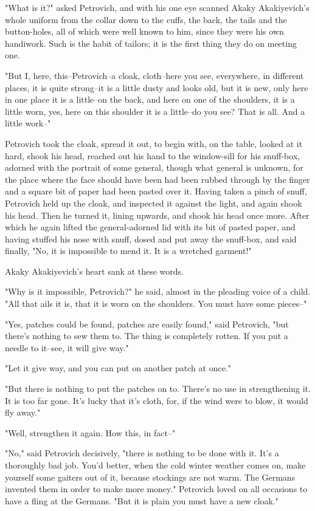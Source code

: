 "What is it?" asked Petrovich, and with his one eye scanned Akaky
Akakiyevich's whole uniform from the collar down to the cuffs, the
back, the tails and the button-holes, all of which were well known to
him, since they were his own handiwork. Such is the habit of tailors;
it is the first thing they do on meeting one.

"But I, here, this--Petrovich--a cloak, cloth--here you see,
everywhere, in different places, it is quite strong--it is a little
dusty and looks old, but it is new, only here in one place it is a
little--on the back, and here on one of the shoulders, it is a little
worn, yes, here on this shoulder it is a little--do you see? That is
all. And a little work--"

Petrovich took the cloak, spread it out, to begin with, on the table,
looked at it hard, shook his head, reached out his hand to the
window-sill for his snuff-box, adorned with the portrait of some
general, though what general is unknown, for the place where the face
should have been had been rubbed through by the finger and a square
bit of paper had been pasted over it. Having taken a pinch of snuff,
Petrovich held up the cloak, and inspected it against the light, and
again shook his head. Then he turned it, lining upwards, and shook his
head once more. After which he again lifted the general-adorned lid
with its bit of pasted paper, and having stuffed his nose with snuff,
dosed and put away the snuff-box, and said finally, "No, it is
impossible to mend it. It is a wretched garment!"

Akaky Akakiyevich's heart sank at these words.

"Why is it impossible, Petrovich?" he said, almost in the pleading
voice of a child. "All that ails it is, that it is worn on the
shoulders. You must have some pieces--"

"Yes, patches could be found, patches are easily found," said
Petrovich, "but there's nothing to sew them to. The thing is
completely rotten. If you put a needle to it--see, it will give way."

"Let it give way, and you can put on another patch at once."

"But there is nothing to put the patches on to. There's no use in
strengthening it. It is too far gone. It's lucky that it's cloth, for,
if the wind were to blow, it would fly away."

"Well, strengthen it again. How this, in fact--"

"No," said Petrovich decisively, "there is nothing to be done with it.
It's a thoroughly bad job. You'd better, when the cold winter weather
comes on, make yourself some gaiters out of it, because stockings are
not warm. The Germans invented them in order to make more money."
Petrovich loved on all occasions to have a fling at the Germans. "But
it is plain you must have a new cloak."

